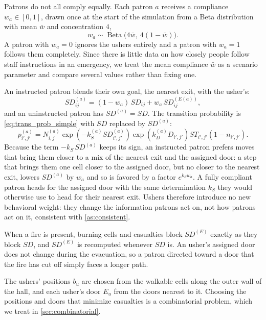 \documentclass[14pt]{article}
\theoremstyle{definition}
\begin{document}
Patrons do not all comply equally. Each patron $a$ receives a compliance
$w_a \in [0,1]$, drawn once at the start of the simulation from a Beta distribution
with mean $\bar w$ and concentration $4$,
\begin{equation}\label{eq:compliance}
    w_a \sim \operatorname{Beta}\bigl(4\bar w,\ 4(1 - \bar w)\bigr).
\end{equation}
A patron with $w_a = 0$ ignores the ushers entirely and a patron with $w_a = 1$ follows
them completely. Since there is little data on how closely people follow staff
instructions in an emergency, we treat the mean compliance $\bar w$ as a scenario
parameter and compare several values rather than fixing one.

An instructed patron blends their own goal, the nearest exit, with the usher's:
\begin{equation}\label{eq:usher_distance}
    SD^{(a)}_{ij} = (1 - w_a)\, SD_{ij} + w_a\, SD^{(E(a))}_{ij},
\end{equation}
and an uninstructed patron has $SD^{(a)} = SD$. The transition probability is
\cref{eq:trans_prob_simple} with $SD$ replaced by $SD^{(a)}$:
\begin{equation}\label{eq:trans_prob_usher}
    p^{(a)}_{i', j'} = N_{i,j}^{(a)}\exp(-k^{(a)}_{S}SD^{(a)}_{i',j'})\exp(k^{(a)}_DD_{i',j'})ST_{i',j'}(1 - n_{i' ,j'}).
\end{equation}
Because the term $-k_S\, SD^{(a)}$ keeps its sign, an instructed patron prefers moves
that bring them closer to a mix of the nearest exit and the assigned door: a step that
brings them one cell closer to the assigned door, but no closer to the nearest exit,
lowers $SD^{(a)}$ by $w_a$ and so is favored by a factor $e^{k_S w_a}$. A fully
compliant patron heads for the assigned door with the same determination $k_S$ they
would otherwise use to head for their nearest exit. Ushers therefore introduce no new
behavioral weight: they change the information patrons act on, not how patrons act on
it, consistent with \cref{as:consistent}.

When a fire is present, burning cells and casualties block $SD^{(E)}$ exactly as they
block $SD$, and $SD^{(E)}$ is recomputed whenever $SD$ is. An usher's assigned door does
not change during the evacuation, so a patron directed toward a door that the fire has
cut off simply faces a longer path.

The ushers' positions $b_u$ are chosen from the walkable cells along the outer wall of
the hall, and each usher's door $E_u$ from the doors nearest to it. Choosing the
positions and doors that minimize casualties is a combinatorial problem, which we treat
in \cref{sec:combinatorial}.
\end{document}
